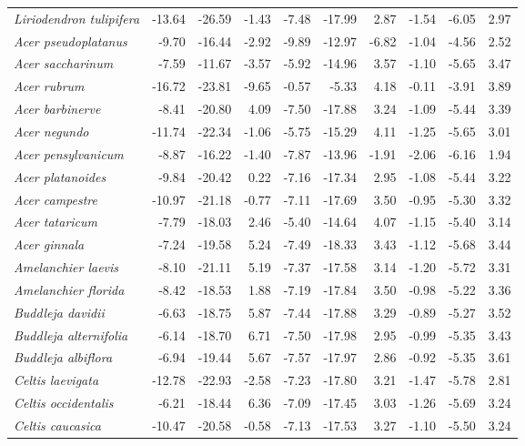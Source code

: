 \documentclass[11pt]{article}
\begin{document}
\begin{longtable}{lrrrrrrrrr}
  \emph{Liriodendron tulipifera} & -13.64 & -26.59 & -1.43 & -7.48 & -17.99 & 2.87 & -1.54 & -6.05 & 2.97 \\ 
  \emph{Acer pseudoplatanus} & -9.70 & -16.44 & -2.92 & -9.89 & -12.97 & -6.82 & -1.04 & -4.56 & 2.52 \\ 
  \emph{Acer saccharinum} & -7.59 & -11.67 & -3.57 & -5.92 & -14.96 & 3.57 & -1.10 & -5.65 & 3.47 \\ 
  \emph{Acer rubrum} & -16.72 & -23.81 & -9.65 & -0.57 & -5.33 & 4.18 & -0.11 & -3.91 & 3.89 \\ 
  \emph{Acer barbinerve} & -8.41 & -20.80 & 4.09 & -7.50 & -17.88 & 3.24 & -1.09 & -5.44 & 3.39 \\ 
  \emph{Acer negundo} & -11.74 & -22.34 & -1.06 & -5.75 & -15.29 & 4.11 & -1.25 & -5.65 & 3.01 \\ 
  \emph{Acer pensylvanicum} & -8.87 & -16.22 & -1.40 & -7.87 & -13.96 & -1.91 & -2.06 & -6.16 & 1.94 \\ 
  \emph{Acer platanoides} & -9.84 & -20.42 & 0.22 & -7.16 & -17.34 & 2.95 & -1.08 & -5.44 & 3.22 \\ 
  \emph{Acer campestre} & -10.97 & -21.18 & -0.77 & -7.11 & -17.69 & 3.50 & -0.95 & -5.30 & 3.32 \\ 
  \emph{Acer tataricum} & -7.79 & -18.03 & 2.46 & -5.40 & -14.64 & 4.07 & -1.15 & -5.40 & 3.14 \\ 
  \emph{Acer ginnala} & -7.24 & -19.58 & 5.24 & -7.49 & -18.33 & 3.43 & -1.12 & -5.68 & 3.44 \\ 
  \emph{Amelanchier laevis} & -8.10 & -21.11 & 5.19 & -7.37 & -17.58 & 3.14 & -1.20 & -5.72 & 3.31 \\ 
  \emph{Amelanchier florida} & -8.42 & -18.53 & 1.88 & -7.19 & -17.84 & 3.50 & -0.98 & -5.22 & 3.36 \\ 
  \emph{Buddleja davidii} & -6.63 & -18.75 & 5.87 & -7.44 & -17.88 & 3.29 & -0.89 & -5.27 & 3.52 \\ 
  \emph{Buddleja alternifolia} & -6.14 & -18.70 & 6.71 & -7.50 & -17.98 & 2.95 & -0.99 & -5.35 & 3.43 \\ 
  \emph{Buddleja albiflora} & -6.94 & -19.44 & 5.67 & -7.57 & -17.97 & 2.86 & -0.92 & -5.35 & 3.61 \\ 
  \emph{Celtis laevigata} & -12.78 & -22.93 & -2.58 & -7.23 & -17.80 & 3.21 & -1.47 & -5.78 & 2.81 \\ 
  \emph{Celtis occidentalis} & -6.21 & -18.44 & 6.36 & -7.09 & -17.45 & 3.03 & -1.26 & -5.69 & 3.24 \\ 
  \emph{Celtis caucasica} & -10.47 & -20.58 & -0.58 & -7.13 & -17.53 & 3.27 & -1.10 & -5.50 & 3.24 \\ 

\end{longtable}
\end{document}
